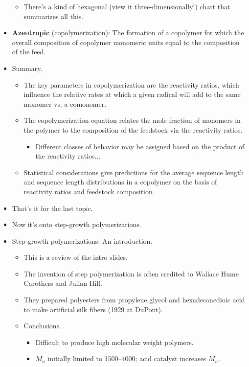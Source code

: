 \documentclass[../notes.tex]{subfiles}
\begin{document}
\begin{itemize}
\begin{itemize}
        \item There's a kind of hexagonal (view it three-dimensionally!) chart that summarizes all this.
    \end{itemize}
    \item \textbf{Azeotropic} (copolymerization): The formation of a copolymer for which the overall composition of copolymer monomeric units equal to the composition of the feed.
    \item Summary.
    \begin{itemize}
        \item The key parameters in copolymerization are the reactivity ratios, which influence the relative rates at which a given radical will add to the same monomer vs. a comonomer.
        \item The copolymerization equation relates the mole fraction of monomers in the polymer to the composition of the feedstock via the reactivity ratios.
        \begin{itemize}
            \item Different classes of behavior may be assigned based on the product of the reactivity ratios...
        \end{itemize}
        \item Statistical considerations give predictions for the average sequence length and sequence length distributions in a copolymer on the basis of reactivity ratios and feedstock composition.
    \end{itemize}
    \item That's it for the last topic.
    \item Now it's onto step-growth polymerizations.
    \item Step-growth polymerizations: An introduction.
    \begin{itemize}
        \item This is a review of the intro slides.
        \item The invention of step polymerization is often credited to Wallace Hume Carothers and Julian Hill.
        \item They prepared polyesters from propylene glycol and hexadecanedioic acid to make artificial silk fibers (1929 at DuPont).
        \item Conclusions.
        \begin{itemize}
            \item Difficult to produce high molecular weight polymers.
            \item $M_n$ initially limited to \numrange{1500}{4000}; acid catalyst increases $M_n$.

\end{itemize}
\end{itemize}
\end{itemize}
\end{document}
